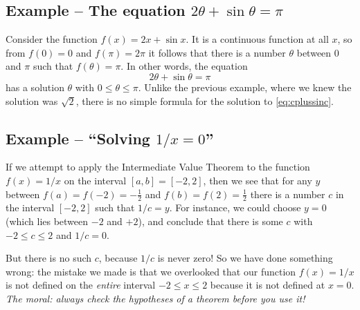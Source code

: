 \subsection{Example -- The equation $2\theta+\sin\theta=\pi$} %
Consider the function $f(x) = 2x+\sin x$.  It is a continuous function
at all $x$, so from $f(0) = 0$ and $f(\pi) = 2\pi$ it follows that
there is a number $\theta$ between $0$ and $\pi$ such that $f(\theta)
= \pi$.  In other words, the equation
\begin{equation}\label{eq:cplussinc}
  2\theta+\sin \theta =\pi
\end{equation}
has a solution $\theta$ with $0\leq \theta\leq \pi$.  Unlike the
previous example, where we knew the solution was $\sqrt2$, there is no
simple formula for the solution to \eqref{eq:cplussinc}.

\subsection{Example -- ``Solving $1/x=0$''} %
If we attempt to apply the Intermediate Value Theorem to the function $f(x) =
1/x$ on the interval $[a,b] = [-2, 2]$, then we see that for any $y$
between $f(a) = f(-2) = -\frac12$ and $f(b) = f(2) = \frac12$ there is
a number $c$ in the interval $[-2, 2]$ such that $1/c = y$.  For
instance, we could choose $y=0$ (which lies between $-2$ and $+2$), and
conclude that there is some $c$ with $-2\leq c\leq 2$ and $1/c = 0$.




But there is no such $c$, because $1/c$ is never zero!  So we have done
something wrong: the mistake we made is that we overlooked that our function
$f(x) = 1/x$ is not defined on the \emph{entire} interval $-2\leq x\leq 2$
because it is not defined at $x=0$.  \textit{The moral: always check the
  hypotheses of a theorem before you use it!}
\marginpar{\footnotesize\sffamily%
}




